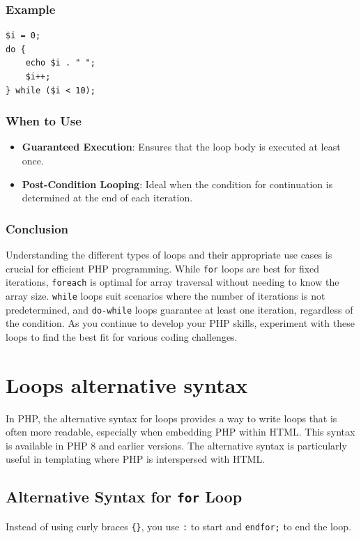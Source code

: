\documentclass[11pt]{article}
\begin{document}
\subsubsection{Example}
\label{sec:orgd497704}
\begin{verbatim}
$i = 0;
do {
    echo $i . " ";
    $i++;
} while ($i < 10);
\end{verbatim}

\subsubsection{When to Use}
\label{sec:orgb797602}
\begin{itemize}
\item \textbf{Guaranteed Execution}: Ensures that the loop body is executed at
least once.
\item \textbf{Post-Condition Looping}: Ideal when the condition for continuation is
determined at the end of each iteration.
\end{itemize}

\subsubsection{Conclusion}
\label{sec:orga573b74}
Understanding the different types of loops and their appropriate use
cases is crucial for efficient PHP programming. While \texttt{for} loops are
best for fixed iterations, \texttt{foreach} is optimal for array traversal
without needing to know the array size. \texttt{while} loops suit scenarios
where the number of iterations is not predetermined, and \texttt{do-while}
loops guarantee at least one iteration, regardless of the condition. As
you continue to develop your PHP skills, experiment with these loops to
find the best fit for various coding challenges.

\section{Loops alternative syntax}
\label{sec:org455c5bf}
In PHP, the alternative syntax for loops provides a way to write loops
that is often more readable, especially when embedding PHP within HTML.
This syntax is available in PHP 8 and earlier versions. The alternative
syntax is particularly useful in templating where PHP is interspersed
with HTML.

\subsection{Alternative Syntax for \texttt{for} Loop}
\label{sec:org215a965}
Instead of using curly braces \texttt{\{\}}, you use \texttt{:} to start and \texttt{endfor;}
to end the loop.
\end{document}
